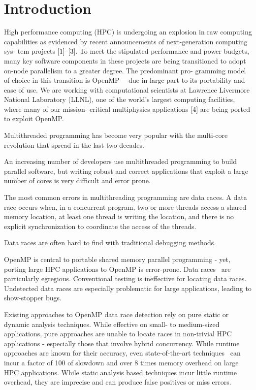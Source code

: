 \section{Introduction}
\label{sec:introduction}

High performance computing (HPC) is undergoing an explosion in raw computing
capabilities as evidenced by recent announcements of next-generation computing
sys- tem projects [1]–[3]. To meet the stipulated performance and power
budgets, many key software components in these projects are being transitioned
to adopt on-node parallelism to a greater degree. The predominant pro-
gramming model of choice in this transition is OpenMP— due in large part to
its portability and ease of use. We are working with computational scientists
at Lawrence Livermore National Laboratory (LLNL), one of the world’s largest
computing facilities, where many of our mission- critical multiphysics
applications [4] are being ported to exploit OpenMP.

Multithreaded programming has become very popular with the multi-core
revolution that spread in the last two decades.

An increasing number of developers use multithreaded programming to
build parallel software, but writing robust and correct applications
that exploit a large number of cores is very difficult and error
prone.

The most common errors in multithreading programming are data races.
A data race occurs when, in a concurrent program, two or more threads
access a shared memory location, at least one thread is writing the
location, and there is no explicit synchronization to coordinate the
access of the threads.

Data races are often hard to find with traditional debugging methods.


OpenMP is central to portable shared memory parallel programming -
yet, porting large HPC applications to OpenMP is error-prone.
%
Data races~\cite{sus_common_2008} are particularly egregious.
%
Conventional testing is ineffective for locating data races.
%
Undetected data races are especially problematic for large
applications, leading to show-stopper bugs.

Existing approaches to OpenMP data race detection rely on pure static
or dynamic analysis techniques.
%
While effective on small- to medium-sized applications, pure
approaches are unable to locate races in non-trivial HPC applications
- especially those that involve hybrid concurrency.
%
While runtime approaches are known for their accuracy, even
state-of-the-art techniques~\cite{flanagan_fasttrack:_2009,tsan} can
incur a factor of 100 of slowdown and over 8 times memory overhead on
large HPC applications.
%
While static analysis based techniques incur little runtime overhead,
they are imprecise and can produce false positives or miss errors.


